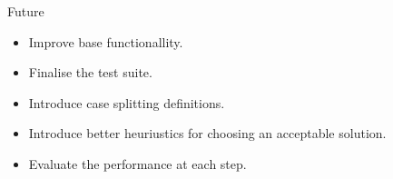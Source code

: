 \documentclass[presentation]{beamer}
\begin{document}
\begin{frame}[fragile]{Future}
  \begin{itemize}
  \item Improve base functionallity.
  \item Finalise the test suite.
  \item Introduce case splitting definitions.
  \item Introduce better heuriustics for choosing an acceptable solution.
  \item Evaluate the performance at each step.
  \end{itemize}
\end{frame}
\end{document}

